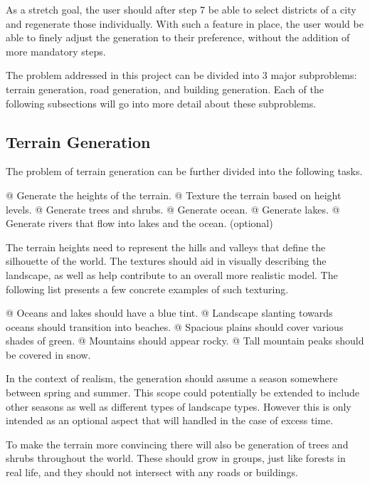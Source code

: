 As a stretch goal, the user should after step 7 be able to select districts of a
city and regenerate those individually. With such a feature in place, the user
would be able to finely adjust the generation to their preference, without the addition of
more mandatory steps.

The problem addressed in this project can be divided into 3 major subproblems:
terrain generation, road generation, and building generation.
Each of the following subsections will go into more detail about these subproblems.

\subsection{Terrain Generation}

The problem of terrain generation can be further divided into the following tasks.
\begin{easylist}
  @ Generate the heights of the terrain.
  @ Texture the terrain based on height levels.
  @ Generate trees and shrubs.
  @ Generate ocean.
  @ Generate lakes.
  @ Generate rivers that flow into lakes and the ocean. (optional)
\end{easylist}

The terrain heights need to represent the hills and valleys that define the silhouette of the world.
The textures should aid in visually describing the landscape, as well as
help contribute to an overall more realistic model. The following list presents
a few concrete examples of such texturing.
\begin{easylist}
  @ Oceans and lakes should have a blue tint.
  @ Landscape slanting towards oceans should transition into beaches.
  @ Spacious plains should cover various shades of green.
  @ Mountains should appear rocky.
  @ Tall mountain peaks should be covered in snow.
\end{easylist}

In the context of realism, the generation should assume a season somewhere
between spring and summer.
This scope could potentially be extended to include other seasons as well as
different types of landscape types.
However this is only intended as an optional aspect that will handled in the case
of excess time.

To make the terrain more convincing there will also be generation of trees and shrubs
throughout the world. These should grow in groups, just like forests in
real life, and they should not intersect with any roads or buildings.

